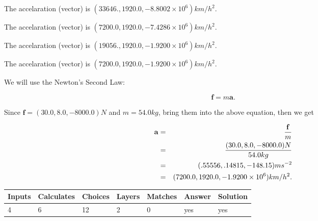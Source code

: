 \documentclass[12pt]{article}
\begin{document}
 
The accelaration (vector) is
$(
33646.,
1920.0 ,
-8.8002 \times 10^{6}
)km/h^2.
$
 
 
The accelaration (vector) is
$(
7200.0,
1920.0 ,
-7.4286 \times 10^{6}
)km/h^2.
$
 
 
The accelaration (vector) is
$(
19056.,
1920.0 ,
-1.9200 \times 10^{6}
)km/h^2.
$
 
 
\noindent{}
 
 
The accelaration (vector) is
$(
7200.0,
1920.0 ,
-1.9200 \times 10^{6}
)km/h^2.
$
 
 
\noindent{}
 
 
 
 
 
 
\noindent{}
 
 

We will use the Newton's Second Law:
 
\[
\mathbf{f}=m\mathbf{a}.
\]
 
Since $\mathbf{f}=( %
30.0,  %
8.0,  %
-8000.0 )N$
and $m= %
54.0 kg$, bring them into the above equation, then we get
 
\begin{eqnarray*}
\mathbf{a}&=&\frac{\mathbf{f}}m  \\
&=&\frac{(
30.0 ,
8.0 ,
-8000.0 )N
}{ %
54.0 kg}  \\
&=&(
.55556 ,
.14815,
-148.15
)ms^{-2} \\
&=&(
7200.0 ,
1920.0 ,
-1.9200 \times 10^{6}
)km/h^2.
\end{eqnarray*}
 
 
 
\noindent{}
 
 

 
 
\vspace{0.3in}
   
   
   
   
\noindent\begin{tabular}{|l|l|l|l|l|l|l|}
 \hline
Inputs & Calculates & Choices & Layers & Matches & Answer & Solution \\ \hline
           4 & 
           6 & 
          12
  & 
           2 & 
           0 & 
  yes & 
  yes 
  \\ \hline
 \end{tabular}
   
\end{document}

